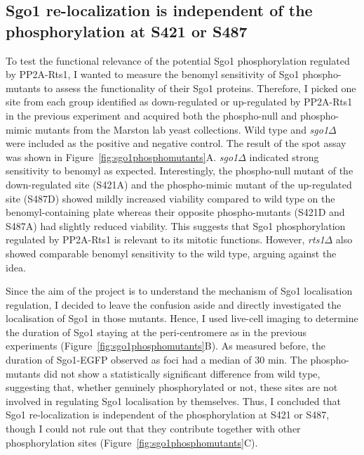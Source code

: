 \subsection{Sgo1 re-localization is independent of the phosphorylation at S421 or S487}

To test the functional relevance of the potential Sgo1 phosphorylation regulated by PP2A-Rts1, I wanted to measure the benomyl sensitivity of Sgo1 phospho-mutants to assess the functionality of their Sgo1 proteins. Therefore, I picked one site from each group identified as down-regulated or up-regulated by PP2A-Rts1 in the previous experiment and acquired both the phospho-null and phospho-mimic mutants from the Marston lab yeast collections. Wild type and \textit{sgo1$\Delta$} were included as the positive and negative control. The result of the spot assay was shown in Figure~\ref{fig:sgo1phosphomutants}A. \textit{sgo1$\Delta$} indicated strong sensitivity to benomyl as expected. Interestingly, the phospho-null mutant of the down-regulated site (S421A) and the phospho-mimic mutant of the up-regulated site (S487D) showed mildly increased viability compared to wild type on the benomyl-containing plate whereas their opposite phospho-mutants (S421D and S487A) had slightly reduced viability. This suggests that Sgo1 phosphorylation regulated by PP2A-Rts1 is relevant to its mitotic functions. However, \textit{rts1$\Delta$} also showed comparable benomyl sensitivity to the wild type, arguing against the idea. 

Since the aim of the project is to understand the mechanism of Sgo1 localisation regulation, I decided to leave the confusion aside and directly investigated the localisation of Sgo1 in those mutants. Hence, I used live-cell imaging to determine the duration of Sgo1 staying at the peri-centromere as in the previous experiments (Figure~\ref{fig:sgo1phosphomutants}B). As measured before, the duration of Sgo1-EGFP observed as foci had a median of 30 \si{\minute}. The phospho-mutants did not show a statistically significant difference from wild type, suggesting that, whether genuinely phosphorylated or not, these sites are not involved in regulating Sgo1 localisation by themselves. Thus, I concluded that Sgo1 re-localization is independent of the phosphorylation at S421 or S487, though I could not rule out that they contribute together with other phosphorylation sites (Figure~\ref{fig:sgo1phosphomutants}C). 

